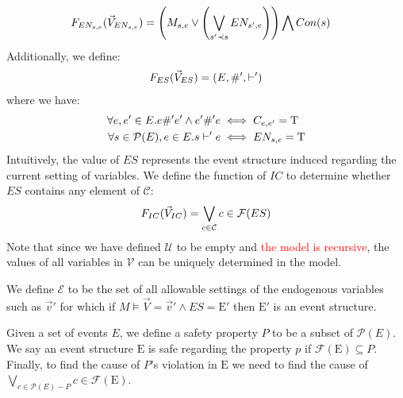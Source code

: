 \begin{align*}
    F_{EN_{s,e}}(\vec V_{EN_{s,e}}) & =
    \left(
    M_{s,e} \vee
    \left(
    \bigvee_{s'\prec s}EN_{s',e}
    \right)
    \right)
    \bigwedge
    Con(s)
\end{align*}
Additionally, we define:
\begin{align*}
    F_{ES}(\vec V_{ES}) = (E,\#',\vdash')
\end{align*}
where we have:
\begin{align*}
    \forall e,e' \in E. e \#' e' \wedge e' \#' e
     & \iff C_{e,e'} = \mathrm{T} \\
    \forall s \in \mathcal{P}(E), e \in E.  s \vdash' e
     & \iff EN_{s,e} = \mathrm{T}
\end{align*}
Intuitively, the value of $ES$ represents the event structure induced
regarding the current setting of variables.
We define the function of $IC$ to determine whether $ES$
contains any element of $\mathcal{C}$:
\begin{align*}
    F_{IC}(\vec V_{IC}) = \bigvee_{c \in \mathcal{C}}c \in \mathcal{F}(ES)
\end{align*}
Note that since we have defined $\mathcal{U}$ to be empty and
\textcolor{red}{the model is recursive}, the values of all variables in
$\mathcal{V}$ can be uniquely determined in the model.

We define $\mathcal{E}$ to be the set of all allowable
settings of the endogenous variables such as $\vec v'$
for which if $M \vDash \vec V = \vec v' \wedge ES = \mathrm{E}'$
then $\mathrm{E}'$ is an event structure.

Given a set of events $E$, we define a safety property $P$ to be a
subset of $\mathcal{P}(E)$.
We say an event structure $\mathrm{E}$ is safe regarding the property
$p$ if $\mathcal{F}(\mathrm{E}) \subseteq P$.
Finally, to find the cause of $P$'s violation in $\mathrm{E}$ we
need to find the cause of
$\bigvee_{c \in \mathcal{P}(E) - P}c \in \mathcal{F}(\mathrm{E})$.


